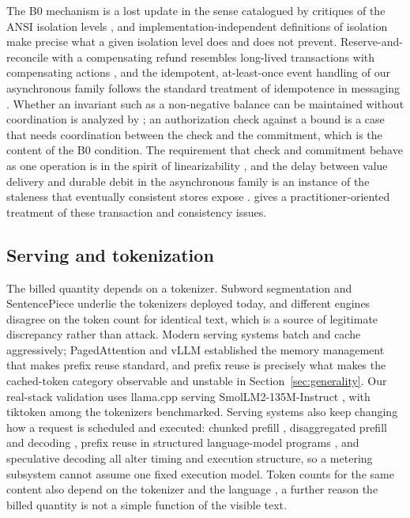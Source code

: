\documentclass[preprint,3p,authoryear,12pt]{elsarticle}
\begin{document}
The B0 mechanism is a lost update in the sense catalogued by critiques of the ANSI
isolation levels \citep{berenson}, and implementation-independent definitions of isolation
\citep{adya} make precise what a given isolation level does and does not prevent.
Reserve-and-reconcile with a compensating refund resembles long-lived transactions with
compensating actions \citep{sagas}, and the idempotent, at-least-once event handling of
our asynchronous family follows the standard treatment of idempotence in messaging
\citep{helland12}. Whether an invariant such as a non-negative balance can be maintained
without coordination is analyzed by \citet{bailis}; an authorization check against a bound
is a case that needs coordination between the check and the commitment, which is the
content of the B0 condition. The requirement that check and commitment behave as one
operation is in the spirit of linearizability \citep{linearizability}, and the delay
between value delivery and durable debit in the asynchronous family is an instance of the
staleness that eventually consistent stores expose \citep{vogels}. \citet{kleppmann} gives
a practitioner-oriented treatment of these transaction and consistency issues.

\subsection{Serving and tokenization}
The billed quantity depends on a tokenizer. Subword segmentation \citep{bpe} and
SentencePiece \citep{sentencepiece} underlie the tokenizers deployed today, and different
engines disagree on the token count for identical text, which is a source of legitimate
discrepancy rather than attack. Modern serving systems batch and cache aggressively;
PagedAttention and vLLM \citep{vllm} established the memory management that makes prefix
reuse standard, and prefix reuse is precisely what makes the cached-token category
observable and unstable in Section~\ref{sec:generality}. Our real-stack validation uses
llama.cpp \citep{llamacpp} serving SmolLM2-135M-Instruct \citep{smollm2}, with tiktoken
\citep{tiktoken} among the tokenizers benchmarked. Serving systems also keep changing how
a request is scheduled and executed: chunked prefill \citep{sarathi}, disaggregated
prefill and decoding \citep{distserve}, prefix reuse in structured language-model
programs \citep{sglang}, and speculative decoding \citep{leviathan} all alter timing and
execution structure, so a metering subsystem cannot assume one fixed execution model.
Token counts for the same content also depend on the tokenizer and the language
\citep{petrov}, a further reason the billed quantity is not a simple function of the
visible text.
\end{document}
